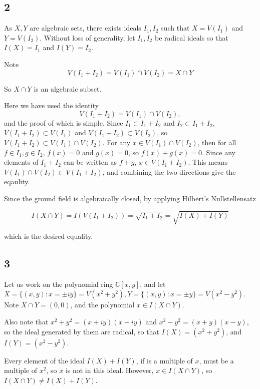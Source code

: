 \documentclass{article}
\theoremstyle{definition}
\theoremstyle{definition}
\theoremstyle{remark}
\newcommand{\bb}[1]{\mathbb{#1}} %
\begin{document}
\subsection*{2}

As $X, Y$ are algebraic sets, there exists ideals $I_1, I_2$ such that $X = V(I_1)$ and $Y = V(I_2)$. 
Without loss of generality, let $I_1, I_2$ be radical ideals so that $I(X) = I_1$ and $I(Y) = I_2$.

Note 
\begin{equation}
	V(I_1 + I_2) = V(I_1) \cap V(I_2) = X \cap Y
\end{equation}

So $X \cap Y$ is an algebraic subset.

Here we have used the identity
\begin{equation}\label{eq:x_cap_y}
	V(I_1 + I_2) = V(I_1) \cap V(I_2),
\end{equation}
and the proof of which is simple.
Since $I_1 \subset I_1 + I_2$ and $I_2 \subset I_1 + I_2$, $V(I_1 + I_2) \subset V(I_1)$ and $V(I_1 + I_2) \subset V(I_2)$, so $V(I_1 + I_2) \subset V(I_1) \cap V(I_2)$.
For any $x \in V(I_1) \cap V(I_2)$, then for all $f \in I_1, g \in I_2$, $f(x) = 0$ and $g(x) = 0$, so $f(x) + g(x) = 0$. 
Since any elements of $I_1 + I_2$ can be written as $f + g$, $x \in V(I_1 + I_2)$.
This means $V(I_1) \cap V(I_2) \subset V(I_1 + I_2)$, and combining the two directions give the eqaulity.

Since the ground field is algebraically closed, by applying Hilbert's Nullstellensatz

$$
I(X \cap Y) = I(V(I_1 + I_2)) = \sqrt{I_1 + I_2} = \sqrt{I(X) + I(Y)}
$$

which is the desired equality.


\subsection*{3}

Let us work on the polynomial ring $\bb{C}[x, y] $, and let $X = \{(x,y): x = \pm iy\} = V(x^2 + y^2), Y = \{(x, y) : x = \pm y\} = V(x^2 - y^2)$.
Note $X \cap Y = {(0,0)}$, and the polynomial $x \in I(X \cap Y)$.

Also note that $x^2 + y^2 = (x+iy)(x-iy)$ and $x^2 - y^2 = (x+y)(x-y)$, so the ideal generated by them are radical, so that $I(X) = (x^2 + y^2)$, and $I(Y) = (x^2 - y^2)$.

Every element of the ideal $I(X) + I(Y)$, if is a multiple of $x$, must be a multiple of $x^2$, so $x$ is not in this ideal.
However, $x \in I(X \cap Y)$, so $I(X \cap Y) \neq I(X) + I(Y)$.
\end{document}
